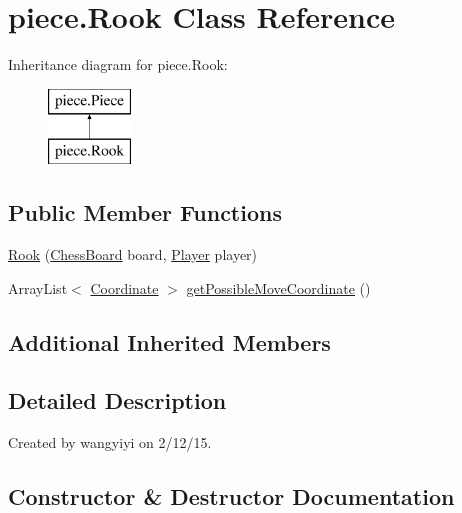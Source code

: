 \hypertarget{classpiece_1_1_rook}{}\section{piece.\+Rook Class Reference}
\label{classpiece_1_1_rook}
Inheritance diagram for piece.\+Rook\+:\begin{figure}[H]
\begin{center}
\leavevmode
\includegraphics[height=2.000000cm]{classpiece_1_1_rook}
\end{center}
\end{figure}
\subsection*{Public Member Functions}
\begin{DoxyCompactItemize}
\item 
\hyperlink{classpiece_1_1_rook_a0a79f7132a0afa353f13cb3a526e8bc7}{Rook} (\hyperlink{classchess_1_1_chess_board}{Chess\+Board} board, \hyperlink{enumchess_1_1_player}{Player} player)
\item 
Array\+List$<$ \hyperlink{classpiece_1_1_coordinate}{Coordinate} $>$ \hyperlink{classpiece_1_1_rook_ae4bd548b81c1224b1db56517315063aa}{get\+Possible\+Move\+Coordinate} ()
\end{DoxyCompactItemize}
\subsection*{Additional Inherited Members}


\subsection{Detailed Description}
Created by wangyiyi on 2/12/15. 

\subsection{Constructor \& Destructor Documentation}
\hypertarget{classpiece_1_1_rook_a0a79f7132a0afa353f13cb3a526e8bc7}{}
